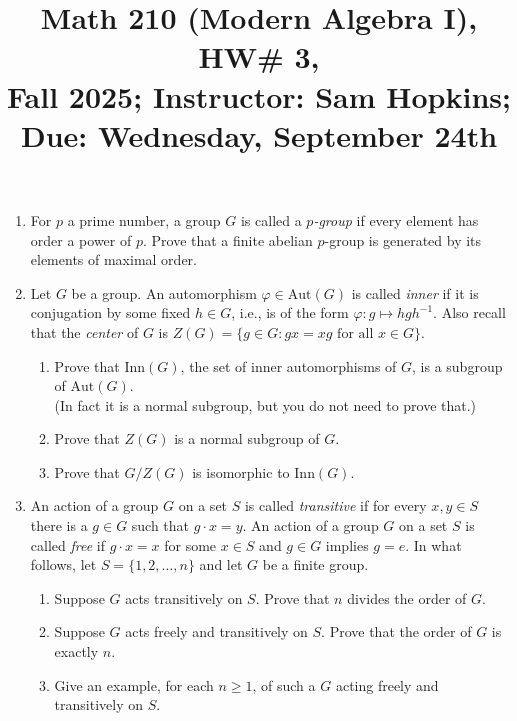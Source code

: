 \documentclass[11pt]{article}
\title{Math 210 (Modern Algebra I), HW\# 3, \\ {\normalsize Fall 2025; Instructor: Sam Hopkins; Due: Wednesday, September 24th}}
\date{}
\begin{document}
\maketitle

\thispagestyle{empty}
\begin{enumerate}

\item For $p$ a prime number, a group $G$ is called a \emph{$p$-group} if every element has order a power of $p$. Prove that a finite abelian $p$-group is generated by its elements of maximal order.

\item Let $G$ be a group. An automorphism $\varphi\in \mathrm{Aut}(G)$ is called \emph{inner} if it is conjugation by some fixed $h\in G$, i.e., is of the form $\varphi\colon g\mapsto hgh^{-1}$. Also recall that the \emph{center} of $G$ is $Z(G) = \{g \in G\colon gx = xg \textrm{ for all $x\in G$}\}$. 
\begin{enumerate}
\item Prove that $\mathrm{Inn}(G)$, the set of inner automorphisms of $G$, is a subgroup of $\mathrm{Aut}(G)$. \\ (In fact it is a normal subgroup, but you do not need to prove that.)
\item Prove that $Z(G)$ is a normal subgroup of $G$.
\item Prove that $G/Z(G)$ is isomorphic to $\mathrm{Inn}(G)$.
\end{enumerate}

\item An action of a group $G$ on a set $S$ is called \emph{transitive} if for every $x,y \in S$ there is a $g\in G$ such that $g \cdot x = y$. An action of a group $G$ on a set $S$ is called \emph{free} if $g \cdot x = x$ for some $x\in S$ and $g\in G$ implies $g=e$. In what follows, let $S=\{1,2,\ldots,n\}$ and let $G$ be a finite group.
\begin{enumerate}
\item Suppose $G$ acts transitively on $S$. Prove that $n$ divides the order of $G$.
\item Suppose $G$ acts freely and transitively on $S$. Prove that the order of $G$ is exactly $n$.
\item Give an example, for each $n \geq 1$, of such a $G$ acting freely and transitively on $S$.
\end{enumerate}


\end{enumerate}
\end{document}

